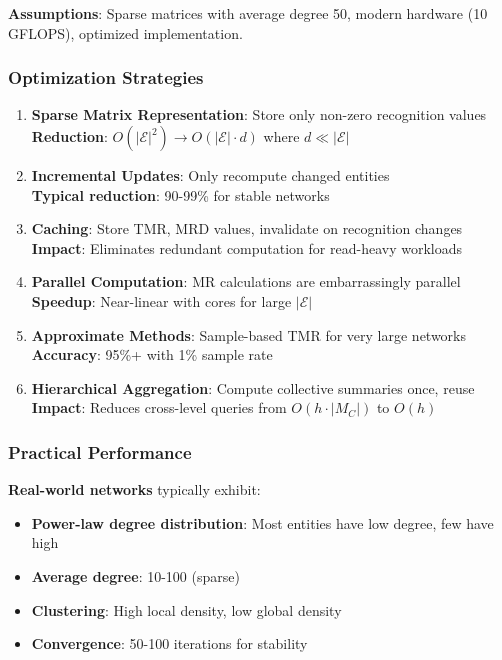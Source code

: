 \documentclass[11pt,a4paper]{article}
\theoremstyle{definition}
\theoremstyle{remark}
\newcommand{\E}{\mathcal{E}}
\begin{document}
\textbf{Assumptions}: Sparse matrices with average degree 50, modern hardware (10 GFLOPS), optimized implementation.

\subsubsection{Optimization Strategies}

\begin{enumerate}
\item \textbf{Sparse Matrix Representation}: Store only non-zero recognition values\\
\textbf{Reduction}: $O(|\E|^2) \rightarrow O(|\E| \cdot d)$ where $d \ll |\E|$

\item \textbf{Incremental Updates}: Only recompute changed entities\\
\textbf{Typical reduction}: 90-99\% for stable networks

\item \textbf{Caching}: Store TMR, MRD values, invalidate on recognition changes\\
\textbf{Impact}: Eliminates redundant computation for read-heavy workloads

\item \textbf{Parallel Computation}: MR calculations are embarrassingly parallel\\
\textbf{Speedup}: Near-linear with cores for large $|\E|$

\item \textbf{Approximate Methods}: Sample-based TMR for very large networks\\
\textbf{Accuracy}: 95\%+ with 1\% sample rate

\item \textbf{Hierarchical Aggregation}: Compute collective summaries once, reuse\\
\textbf{Impact}: Reduces cross-level queries from $O(h \cdot |M_C|)$ to $O(h)$
\end{enumerate}

\subsubsection{Practical Performance}

\textbf{Real-world networks} typically exhibit:
\begin{itemize}
\item \textbf{Power-law degree distribution}: Most entities have low degree, few have high
\item \textbf{Average degree}: 10-100 (sparse)
\item \textbf{Clustering}: High local density, low global density
\item \textbf{Convergence}: 50-100 iterations for stability
\end{itemize}
\end{document}

